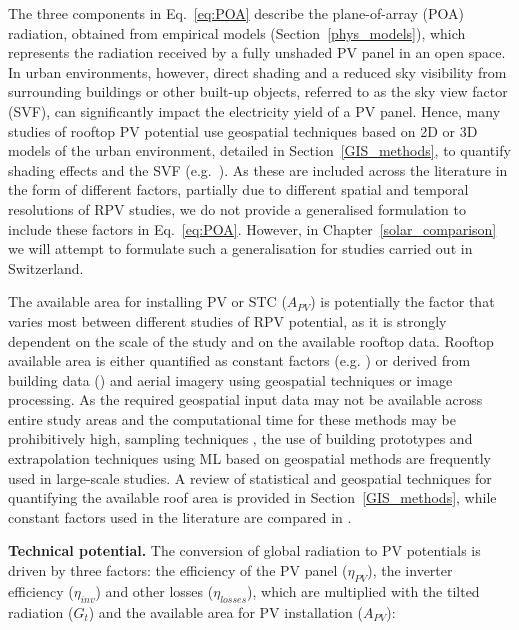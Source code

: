 The three components in Eq.~\ref{eq:POA} describe the plane-of-array (POA) radiation, obtained from empirical models (Section~\ref{phys_models}), which represents the radiation received by a fully unshaded PV panel in an open space. 
In urban environments, however, direct shading and a reduced sky visibility from surrounding buildings or other built-up objects, referred to as the sky view factor (SVF), can significantly impact the electricity yield of a PV panel. 
Hence, many studies of rooftop PV potential use geospatial techniques based on 2D or 3D models of the urban environment, detailed in Section~\ref{GIS_methods}, to quantify shading effects and the SVF (e.g.~\cite{desthieux_solar_2018,calcabrini_simplified_2019,wegertseder_combining_2016,jakubiec_method_2013}).
As these are included across the literature in the form of different factors, partially due to different spatial and temporal resolutions of RPV studies, we do not provide a generalised formulation to include these factors in Eq.~\ref{eq:POA}. However, in Chapter~\ref{solar_comparison} we will attempt to formulate such a generalisation for studies carried out in Switzerland.

The available area for installing PV or STC ($A_{PV}$) is potentially the factor that varies most between different studies of RPV potential, as it is strongly dependent on the scale of the study and on the available rooftop data. 
Rooftop available area is either quantified as constant factors (e.g. \cite{iea_potential_2002,wegertseder_combining_2016,portmann_sonnendach.ch:_2016}) or derived from building data (\cite{ramirez_camargo_spatio-temporal_2015,assouline_quantifying_2017,hong_development_2017}) and aerial imagery \cite{mainzer_assessment_2017} using geospatial techniques or image processing. 
As the required geospatial input data may not be available across entire study areas and the computational time for these methods may be prohibitively high, sampling techniques \cite{izquierdo_method_2008}, the use of building prototypes \cite{wegertseder_combining_2016} and extrapolation techniques using ML \cite{assouline_quantifying_2017,assouline_large-scale_2018} based on geospatial methods are frequently used in large-scale studies. 
A review of statistical and geospatial techniques for quantifying the available roof area is provided in Section~\ref{GIS_methods}, while constant factors used in the literature are compared in \cite{assouline_estimation_2017,wiginton_quantifying_2010,singh_estimation_2015}.

\textbf{Technical potential.} The conversion of global radiation to PV potentials is driven by three factors: the efficiency of the PV panel ($\eta_{PV}$), the inverter efficiency ($\eta_\mathit{inv}$) and other losses ($\eta_\mathit{losses}$), which are multiplied with the tilted radiation ($G_t$) and the available area for PV installation ($A_{PV}$):

